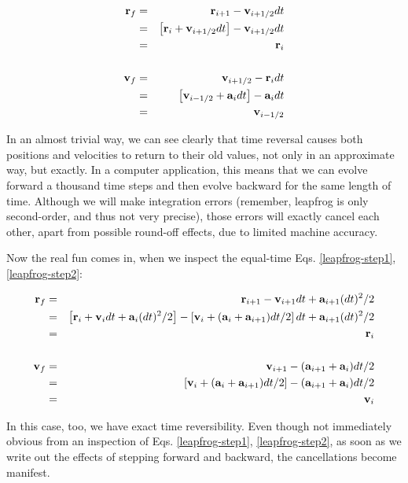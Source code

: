 \begin{eqnarray}
{\bf r}_f & = & {\bf r}_{i+1} - {\bf v}_{i+1/2} dt \nonumber \\
      & = & \left[ {\bf r}_i + {\bf v}_{i+1/2} dt \right]
            - {\bf v}_{i+1/2} dt \nonumber \\
      & = & {\bf r}_i \\
                  \nonumber \\
{\bf v}_f & = & {\bf v}_{i+1/2} - {\bf r}_i dt \nonumber \\
      & = & \left[ {\bf v}_{i-1/2} + {\bf a}_i dt \right]
            - {\bf a}_i dt \nonumber \\
      & = & {\bf v}_{i-1/2}
\end{eqnarray}

In an almost trivial way, we can see clearly that time reversal causes
both positions and velocities to return to their old values, not only
in an approximate way, but exactly.  In a computer application, this
means that we can evolve forward a thousand time steps and then evolve
backward for the same length of time.  Although we will make
integration errors (remember, leapfrog is only second-order, and thus
not very precise), those errors will exactly cancel each other, apart
from possible round-off effects, due to limited machine accuracy.

Now the real fun comes in, when we inspect the equal-time
Eqs. \ref{leapfrog-step1}, \ref{leapfrog-step2}:

\begin{eqnarray}
{\bf r}_f & = & {\bf r}_{i+1} - {\bf v}_{i+1} dt + {\bf a}_{i+1} (dt)^2/2 \nonumber \\
      & = & \left[ {\bf r}_i + {\bf v}_i dt + {\bf a}_i (dt)^2/2 \right]
            - \left[ {\bf v}_i + ({\bf a}_i + {\bf a}_{i+1})dt / 2 \right] dt
            + {\bf a}_{i+1} (dt)^2/2 \nonumber \\
      & = & {\bf r}_i \\
                  \nonumber \\
{\bf v}_f & = & {\bf v}_{i+1} - ({\bf a}_{i+1} + {\bf a}_i)dt / 2  \nonumber \\
      & = & \left[ {\bf v}_i + ({\bf a}_i + {\bf a}_{i+1})dt / 2 \right]
            - ({\bf a}_{i+1} + {\bf a}_i)dt / 2  \nonumber \\
      & = & {\bf v}_i
\end{eqnarray}

In this case, too, we have exact time reversibility.  Even though not
immediately obvious from an inspection of Eqs. \ref{leapfrog-step1},
\ref{leapfrog-step2}, as soon as we write out the effects of stepping
forward and backward, the cancellations become manifest.

